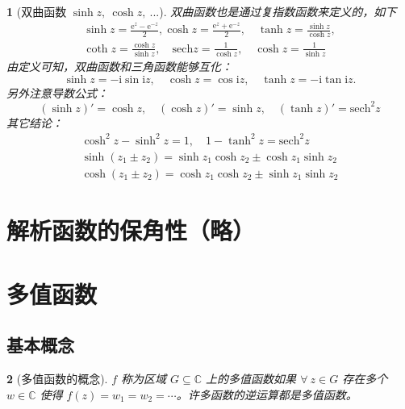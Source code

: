 \documentclass[UTF8]{report}
\def\C{\mathbb{C}}
\theoremstyle{MyLineTheoremStyle} %
\theoremstyle{MyBlockTheoremStyle} %
\theoremstyle{MySubsubsectionStyle} %
\newtheorem{definition}{}
\begin{document}
\begin{definition}[双曲函数 $\sinh z,\ \cosh z,\ ...$]
双曲函数也是通过复指数函数来定义的，如下
\begin{gather}
    \sinh z=\frac{\mathrm{e}^{z}-\mathrm{e}^{-z}}{2},\cosh z=\frac{\mathrm{e}^{z}+\mathrm{e}^{-z}}{2},\quad\tanh z=\frac{\sinh z}{\cosh z},\\\coth z=\frac{\cosh z}{\sinh z},\quad\mathrm{sech}z=\frac{1}{\cosh z},\quad\cosh z=\frac{1}{\sinh z}
\end{gather}
由定义可知，双曲函数和三角函数能够互化：
\begin{equation}
    \sinh z=-\mathrm{i}\sin\mathrm{i}z,\quad\cosh z=\cos\mathrm{i}z,\quad\tanh z=-\mathrm{i}\tan\mathrm{i}z.
\end{equation}
另外注意导数公式：
\begin{equation}
    (\sinh z)'=\cosh z,\quad(\cosh z)'=\sinh z,\quad(\tanh z)'=\mathrm{sech}^2z
\end{equation}
其它结论：
\begin{gather}
    \cosh^{2}z-\sinh^{2}z=1, \quad1-\tanh^{2}z=\mathrm{sech}^{2}z \\ 
    \sinh\left(z_{1}\pm z_{2}\right)=\sinh z_{1}\cosh z_{2}\pm\cosh z_{1}\sinh z_{2}\\
    \cosh\left(z_{1}\pm z_{2}\right)=\cosh z_{1}\cosh z_{2}\pm\sinh z_{1}\sinh z_{2}
\end{gather}
\end{definition}

\section{解析函数的保角性（略）}
\section{多值函数}

\subsection{基本概念}

\begin{definition}[多值函数的概念]
$f$ 称为区域 $G \subseteq \C$ 上的多值函数如果 $\forall\ z \in G$ 存在多个 $w \in \C$ 使得 $f(z) = w_1 = w_2 = \cdots $。许多函数的逆运算都是多值函数。
\end{definition}
\end{document}
